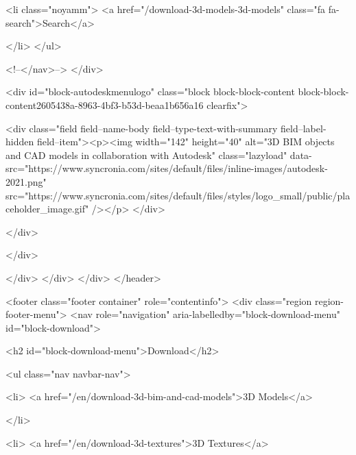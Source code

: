                    
            
      
            
    

                    <li class="noyamm">
                  <a href="/download-3d-models-3d-models" class="fa fa-search">Search</a>
                    
            </li>
        </ul>
  

          <!--</nav>-->
  </div>


<div id="block-autodeskmenulogo" class="block block-block-content block-block-content2605438a-8963-4bf3-b53d-beaa1b656a16 clearfix">
  
    

      
            <div class="field field--name-body field--type-text-with-summary field--label-hidden field--item"><p><img width="142" height="40" alt="3D BIM objects and CAD models in collaboration with Autodesk" class="lazyload" data-src="https://www.syncronia.com/sites/default/files/inline-images/autodesk-2021.png" src="https://www.syncronia.com/sites/default/files/styles/logo_small/public/placeholder_image.gif" /></p>
</div>
      
  </div>


  </div>

            </div>
                              </div>
        </div>
      </header>
      
            <footer class="footer container" role="contentinfo">
          <div class="region region-footer-menu">
    <nav role="navigation" aria-labelledby="block-download-menu" id="block-download">
      
  <h2 id="block-download-menu">Download</h2>
  

        
              <ul class="nav navbar-nav">
            
                   
            
      
            
    

                    <li>
                  <a href="/en/download-3d-bim-and-cad-models">3D Models</a>
                    
            </li>
        
                   
            
      
            
    

                    <li>
                  <a href="/en/download-3d-textures">3D Textures</a>
                    
